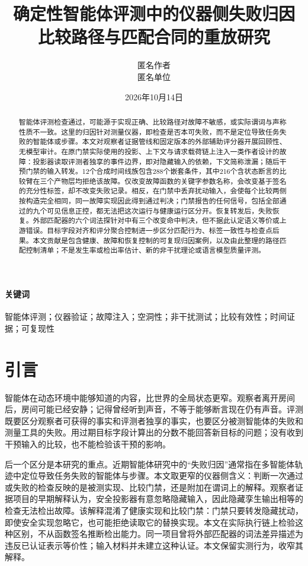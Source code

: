 \documentclass[UTF8,11pt]{ctexart}
\title{确定性智能体评测中的仪器侧失败归因\\
\large 比较路径与匹配合同的重放研究}
\author{匿名作者\\匿名单位}
\date{2026年10月14日}
\begin{document}
\maketitle
\begin{abstract}
智能体评测检查通过，可能源于实现正确、比较路径对故障不敏感，或实际谓词与声称性质不一致。这里的归因针对测量仪器，即检查是否本可失败，而不是定位导致任务失败的智能体或步骤。本文对观察者证据管线和固定版本的外部辅助评分器开展回顾性、无模型审计。在原门禁实际使用的投影、上下文与请求载荷链上注入一类作者设计的故障：投影器读取评测者独享的事件边界，即对隐藏输入的依赖，下文简称泄漏；随后干预门禁的输入转发。12个合成时间线族包含288个嵌套条件，其中216个含状态断言的比较臂在三个产物层均拒绝该故障。仅改变故障函数的关键字参数名称，会改变基于签名的充分性标签，却不改变失败记录。相反，在门禁中丢弃扰动输入，会使每个比较两侧按构造完全相同，同一故障实现因此得到通过判决；门禁报告的任何信号，包括全部通过的九个可见信息正控，都无法把这次运行与健康运行区分开。恢复转发后，失败恢复。外部匹配器的六个词法探针对中有三个改变命中判决，但不据此认定语义等价或上游错误。目标字段对齐和评分聚合控制进一步区分匹配行为、标签一致性与检查点后果。本文贡献是包含健康、故障和恢复控制的可复现归因案例，以及由此整理的路径匹配控制清单；不是发生率或检出率估计、新的非干扰理论或语言模型质量评测。
\end{abstract}
\paragraph{关键词} 智能体评测；仪器验证；故障注入；空洞性；非干扰测试；比较有效性；时间证据；可复现性

\section{引言}
智能体在动态环境中能够知道的内容，比世界的全局状态更窄。观察者离开房间后，房间可能已经安静；记得曾经听到声音，不等于能够断言现在仍有声音。评测既要区分观察者可获得的事实和评测者独享的事实，也要区分被测智能体的失败和测量工具的失败。用过期目标字段计算出的分数不能回答新目标的问题；没有收到干预输入的比较，也不能检验该干预的影响。

后一个区分是本研究的重点。近期智能体研究中的“失败归因”通常指在多智能体轨迹中定位导致任务失败的智能体与步骤\cite{mast,whowhen}。本文取更窄的仪器侧含义：判断一次通过或失败的检查反映的是被测实现、比较门禁，还是附加在谓词上的解释。观察者证据项目的早期解释认为，安全投影器有意忽略隐藏输入，因此隐藏孪生输出相等的检查无法检出故障。该解释混淆了健康实现和比较门禁：门禁只要转发隐藏扰动，即使安全实现忽略它，也可能拒绝读取它的替换实现。本文在实际执行链上检验这种区别，不从函数签名推断检出能力。同一项目曾将外部匹配器的词法差异描述为违反已认证表示等价性；输入材料并未建立这种认证。本文保留实测行为，收窄其解释。
\end{document}
